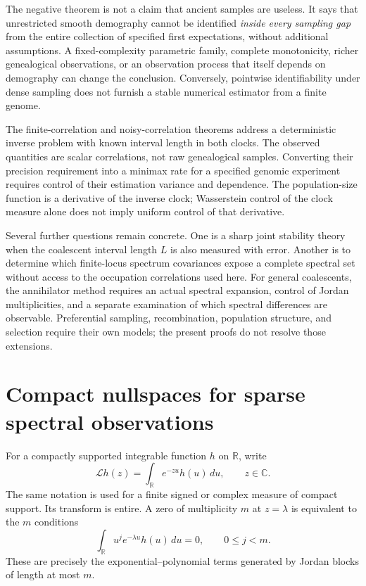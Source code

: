 \documentclass[11pt]{article}
\theoremstyle{definition}
\theoremstyle{remark}
\numberwithin{equation}{section}
\begin{document}
The negative theorem is not a claim that ancient samples are useless.
It says that unrestricted smooth demography cannot be identified
\emph{inside every sampling gap} from the entire collection of specified
first expectations, without additional assumptions. A fixed-complexity
parametric family, complete monotonicity, richer genealogical
observations, or an observation process that itself depends on demography
can change the conclusion. Conversely, pointwise identifiability under
dense sampling does not furnish a stable numerical estimator from a
finite genome.

The finite-correlation and noisy-correlation theorems address a
deterministic inverse problem with known interval length in both clocks.
The observed quantities are scalar correlations, not raw genealogical
samples. Converting their precision requirement into a minimax rate for
a specified genomic experiment requires control of their estimation
variance and dependence. The population-size function is a derivative
of the inverse clock; Wasserstein control of the clock measure alone
does not imply uniform control of that derivative.

Several further questions remain concrete. One is a sharp joint
stability theory when the coalescent interval length $L$ is also measured
with error. Another is to determine which finite-locus spectrum
covariances expose a complete spectral set without access to the
occupation correlations used here. For general coalescents, the
annihilator method requires an actual spectral expansion, control of
Jordan multiplicities, and a separate examination of which spectral
differences are observable. Preferential sampling, recombination,
population structure, and selection require their own models; the
present proofs do not resolve those extensions.



\appendix


\section{Compact nullspaces for sparse spectral observations}
\label{spec:section}\label{sec:sparse}

For a compactly supported integrable function $h$ on $\mathbb R$, write
\[
 \mathcal Lh(z)=\int_{\mathbb R}e^{-zu}h(u)\,du,
 \qquad z\in\mathbb C.
\]
The same notation is used for a finite signed or complex measure of
compact support. Its transform is entire. A zero of multiplicity $m$
at $z=\lambda$ is equivalent to the $m$ conditions
\[
 \int_{\mathbb R}u^j e^{-\lambda u}h(u)\,du=0,
 \qquad 0\le j<m.
\]
These are precisely the exponential--polynomial terms generated by
Jordan blocks of length at most $m$.
\end{document}
